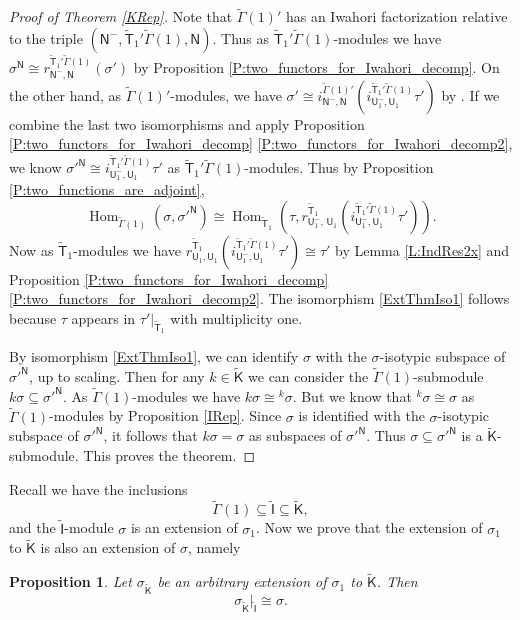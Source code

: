 \documentclass[10pt, letterpaper]{amsart}
\theoremstyle{plain}
\newtheorem{Prop}[equation]{Proposition}
\theoremstyle{definition}
\numberwithin{equation}{section}
\newcommand{\Gammaft}{\widetilde{\mathsf{\Gamma}}}
\newcommand{\Hom}{\operatorname{Hom}}
\newcommand{\If}{\mathsf{I}}
\newcommand{\Kf}{\mathsf{K}}
\newcommand{\Nf}{\mathsf{N}}
\newcommand{\Uf}{\mathsf{U}}
\newcommand{\Gammaf}{\mathsf{\Gamma}}
\newcommand{\Kft}{\widetilde{\mathsf{K}}}
\newcommand{\Tft}{\widetilde{\mathsf{T}}}
\begin{document}
\begin{proof}[Proof of Theorem \ref{KRep}]
    Note that $\Gammaft(1)'$ has an Iwahori factorization relative to the triple $(\Nf^{-},\Tft_{1}'\Gammaft(1),\Nf)$. Thus as $\Tft_{1}'\Gammaft(1)$-modules we have $\sigma^{\Nf}\cong r_{\Nf^{-},\Nf}^{\Tft_{1}'\Gammaft(1)}(\sigma')$ by Proposition \ref{P:two_functors_for_Iwahori_decomp}. On the other hand, as $\Gammaft(1)'$-modules, we have $\sigma'\cong i_{\Nf^{-},\Nf}^{\Gammaft(1)'}\left(i_{\Uf^{-}_{1},\Uf_{1}}^{\Tft_{1}'\Gammaft(1)}\tau'\right)$ by \cite[Theorem 2.17 (7)]{CMO19}. If we combine the last two isomorphisms and apply Proposition \ref{P:two_functors_for_Iwahori_decomp} \eqref{P:two_functors_for_Iwahori_decomp2}, we know ${\sigma'}^{\Nf}\cong i_{\Uf^-_{1},\Uf_{1}}^{\Tft_{1}'\Gammaft(1)}\tau'$ as $\Tft_{1}'\Gammaft(1)$-modules. Thus by Proposition \ref{P:two_functions_are_adjoint},  
    \begin{equation*}
        \Hom_{\Gammaft(1)}(\sigma,{\sigma'}^{\Nf})\cong \Hom_{\Tft_{1}}(\tau,r_{\Uf_{1}^{-},\,\Uf_{1}}^{\Tft_{1}}\left(i_{\Uf^-_{1},\Uf_{1}}^{\Tft_{1}'\Gammaft(1)}\tau'\right)).
    \end{equation*}
    Now as $\Tft_{1}$-modules we have $r_{\Uf_{1},\Uf_{1}}^{\Tft_{1}}\left(i_{\Uf^-_{1},\Uf_{1}}^{\Tft_{1}'\Gammaft(1)}\tau'\right)\cong \tau'$ by Lemma \ref{L:IndRes2x} and Proposition \ref{P:two_functors_for_Iwahori_decomp} \eqref{P:two_functors_for_Iwahori_decomp2}. The isomorphism \eqref{ExtThmIso1} follows because $\tau$ appears in $\tau'|_{\Tft_1}$ with multiplicity one.

    By isomorphism \eqref{ExtThmIso1}, we can identify $\sigma$ with the $\sigma$-isotypic subspace of ${\sigma'}^{\Nf}$, up to scaling. Then for any $k\in\Kft$ we can consider the $\Gammaft(1)$-submodule $k\sigma\subseteq {\sigma'}^{\Nf}$. As $\Gammaft(1)$-modules we have $k\sigma\cong {}^{k}\!\sigma$. But we know that ${}^k\!\sigma\cong \sigma$ as $\Gammaft(1)$-modules by Proposition \ref{IRep}. Since $\sigma$ is identified with the $\sigma$-isotypic subspace of ${\sigma'}^{\Nf}$, it follows that $k\sigma=\sigma$ as subspaces of ${\sigma'}^{\Nf}$. Thus $\sigma\subseteq{\sigma'}^{\Nf}$ is a $\Kft$-submodule. This proves the theorem.
\end{proof}

Recall we have the inclusions
\[
\widetilde{\Gammaf}(1)\subseteq \widetilde{\If}\subseteq \widetilde{\Kf},
\]
and the $\widetilde{\If}$-module $\sigma$ is an extension of $\sigma_1$. Now we prove that the extension of $\sigma_{1}$ to $\widetilde{{\Kf}}$ is also an extension of $\sigma$, namely
\begin{Prop}\label{ExtICompat}
   Let $\sigma_{\widetilde{{\Kf}}}$ be an arbitrary extension of $\sigma_{1}$ to $\widetilde{\Kf}$. Then 
   \[
   \sigma_{\widetilde{{\Kf}}}|_{\widetilde{{\If}}}\cong \sigma.
   \]
\end{Prop}
\end{document}
